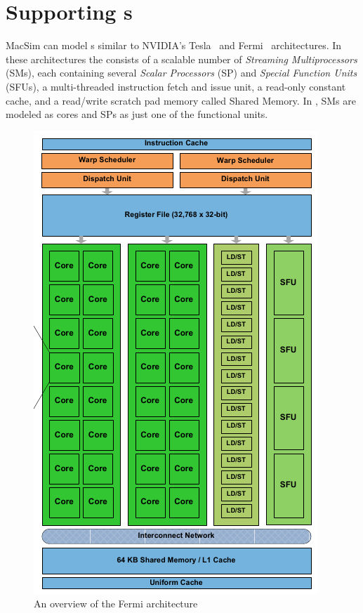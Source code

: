 \chapter{Supporting {\gpu}s}

MacSim can model {\gpu}s similar to NVIDIA's Tesla~\cite{lin:nic08} and
Fermi~\cite{fermi} architectures.  In these architectures the {\gpu} consists of a
scalable number of {\em Streaming Multiprocessors} (SMs), each containing
several {\em Scalar Processors} (SP) and {\em Special Function Units} (SFUs), a
multi-threaded instruction fetch and issue unit, a read-only constant cache, and
a read/write scratch pad memory called Shared Memory.  In \SIM, SMs are modeled
as cores and SPs as just one of the functional units. 


		\begin{figure}[htb]
		\centering
		\includegraphics[scale=0.5]{figs/fermi_arch.png}
		\caption{An overview of the Fermi {\gpu} architecture}
		\label{fig:g80}
		\end{figure}

